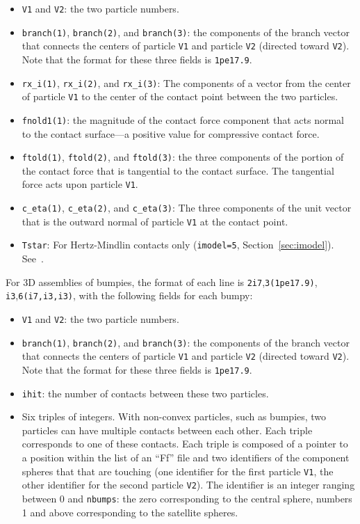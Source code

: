 \documentclass[letterpaper,11pt]{article}
\begin{document}
\begin{itemize}
\item
\texttt{V1} and \texttt{V2}:
the two particle numbers.
\item
\texttt{branch(1)}, \texttt{branch(2)}, and \texttt{branch(3)}:
the components of the branch vector that
connects the centers of particle \texttt{V1} and particle \texttt{V2}
(directed toward \texttt{V2}).  Note that the format for these three fields
is \texttt{1pe17.9}.
\item
\texttt{rx\_i(1)}, \texttt{rx\_i(2)}, and \texttt{rx\_i(3)}:
The components of a vector from the center of particle \texttt{V1}
to the center of the contact point between the two particles.
\item
\texttt{fnold1(1)}:
the magnitude of the contact force
component that acts normal to the contact surface---a
positive value for compressive contact force.
\item
\texttt{ftold(1)}, \texttt{ftold(2)}, and \texttt{ftold(3)}:
the three components of the portion of the contact force
that is tangential to the contact surface.
The tangential force acts upon particle \texttt{V1}.
\item
\texttt{c\_eta(1)}, \texttt{c\_eta(2)}, and \texttt{c\_eta(3)}:
The three components of the unit vector that is the outward normal
of particle \texttt{V1} at the contact point.
\item
\texttt{Tstar}:
For Hertz-Mindlin contacts only (\texttt{imodel=5},
Section~\ref{sec:imodel}). See~\cite{Thornton:1988a}.
\end{itemize}
%
\par
For 3D assemblies of bumpies,
the format of each line is \texttt{2i7},\texttt{3(1pe17.9)},
\texttt{i3},\texttt{6(i7,i3,i3)}, with
the following fields for each bumpy:
\begin{itemize}
\item
\texttt{V1} and \texttt{V2}:
the two particle numbers.
\item
\texttt{branch(1)}, \texttt{branch(2)}, and \texttt{branch(3)}:
the components of the branch vector that
connects the centers of particle \texttt{V1} and particle \texttt{V2}
(directed toward \texttt{V2}).  Note that the format for these three fields
is \texttt{1pe17.9}.
\item
\texttt{ihit}: the number of contacts between these two particles.
\item
Six triples of integers.  With non-convex particles, such as bumpies,
two particles can have multiple contacts between each other.
Each triple corresponds to one of these contacts.
Each triple is composed of a pointer to
a position within the list of an ``Ff'' file and two identifiers 
of the component spheres that that are touching (one identifier for
the first particle \texttt{V1}, the other identifier for the
second particle \texttt{V2}).
The identifier is an integer ranging between 0 and \texttt{nbumps}:
the zero corresponding to the central sphere, numbers 1 and above 
corresponding to the satellite spheres.
\end{itemize}
%
\end{document}
